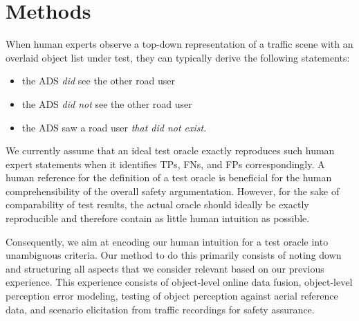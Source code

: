 \documentclass[conference]{IEEEtran}
\begin{document}
\section{Methods}
\label{sec:method}


When human experts observe a top-down representation of a traffic scene with an overlaid object list under test, they can typically derive the following statements:
\begin{itemize}
	\item the ADS \textit{did} see the other road user
	\item the ADS \textit{did not} see the other road user 
	\item the ADS saw a road user \textit{that did not exist}.
\end{itemize}

We currently assume that an ideal test oracle exactly reproduces such human expert statements when it identifies TPs, FNs, and FPs correspondingly.
A human reference for the definition of a test oracle is beneficial for the human comprehensibility of the overall safety argumentation. 
However, for the sake of comparability of test results, the actual oracle should ideally be exactly reproducible and therefore contain as little human intuition as possible. 

Consequently, we aim at encoding our human intuition for a test oracle into unambiguous criteria. 
Our method to do this primarily consists of noting down and structuring all aspects that we consider relevant based on our previous experience. 
This experience consists of object-level online data fusion, object-level perception error modeling, testing of object perception against aerial reference data, and scenario elicitation from traffic recordings for safety assurance. 






\end{document}
